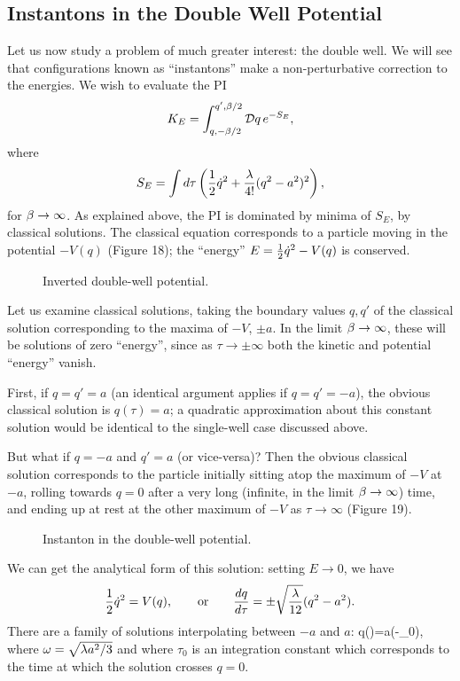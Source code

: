 \documentclass[12pt]{article}
\begin{document}
\subsection{Instantons in the Double Well Potential}
Let us now study a problem of much greater
interest: the double well. We will see
that configurations known as ``instantons'' make a non-perturbative
correction to the energies. We wish to evaluate the PI
\[
K_E=\int_{q,-\be/2}^{q',\be/2}\DD q\,e^{-S_E},
\]
where
\[
S_E=\int d\tau\left({\frac 12}{\dot q}^2+{\lambda\over4!}(q^2-a^2)^2\right),
\]
for ${\beta}\to\infty$. As explained above, the PI is dominated by minima
of $S_E$, \ie by classical solutions. The classical equation
corresponds to a particle moving in the potential $-V(q)$
(Figure 18); the ``energy'' $E={\frac 12}{\dot q}^2-V(q)$ is conserved.

\begin{figure}[hb]
\epsfysize=5cm
\centerline{}
\caption{Inverted double-well potential.}
\end{figure}


Let us examine classical solutions, taking the boundary values $q,q'$
of the classical solution corresponding to the maxima of $-V$, $\pm
a$. In the limit ${\beta}\to\infty$, these will be solutions of zero
``energy'', since as $\tau\to\pm\infty$ both the kinetic and potential
``energy'' vanish.

First, if $q=q'=a$ (an identical argument applies if $q=q'=-a$), the
obvious classical
solution is $q(\tau)=a$; a quadratic approximation about this
constant solution would be identical to the single-well case discussed
above.

But what if $q=-a$ and $q'=a$ (or vice-versa)? Then the obvious
classical solution corresponds to the particle initially sitting atop the
maximum of $-V$ at $-a$, rolling towards $q=0$ after a very long
(infinite, in the limit ${\beta}\to\infty$) time, and ending up at
rest at the other maximum of $-V$ as $\tau\to\infty$ (Figure 19).
\begin{figure}[hb]
\epsfysize=5cm
\centerline{}
\caption{Instanton in the double-well potential.}
\end{figure}


We can get the analytical form of this solution: setting $E\to0$, we
have
\[
{\frac 12}{\dot q}^2=V(q),\qquad\mbox{or}\qquad
{dq\over d\tau}=\pm\sqrt{\lambda\over12}(q^2-a^2).
\]
There are a family of solutions interpolating between $-a$ and $a$:
\beq
q(\tau)=a(\tau-\tau_0),
\label{instanton}
\eeq
where ${\omega}=\sqrt{\lambda a^2/3}$ and where $\tau_0$ is an integration
constant which corresponds to the time at which the solution crosses
$q=0$.
\end{document}
